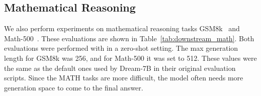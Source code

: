 \documentclass{article}
\begin{document}
\subsection{Mathematical Reasoning}\label{app:math_reasoning}

We also perform experiments on mathematical reasoning tasks GSM8k~\citep{cobbe_training_2021} and Math-500~\citep{lightman2024math}. These evaluations are shown in Table~\ref{tab:downstream_math}. Both evaluations were performed with  in a zero-shot setting. The max generation length for GSM8k was 256, and for Math-500 it was set to 512. These values were the same as the default ones used by Dream-7B in their original evaluation scripts. Since the MATH tasks are more difficult, the model often needs more generation space to come to the final answer.
\end{document}

